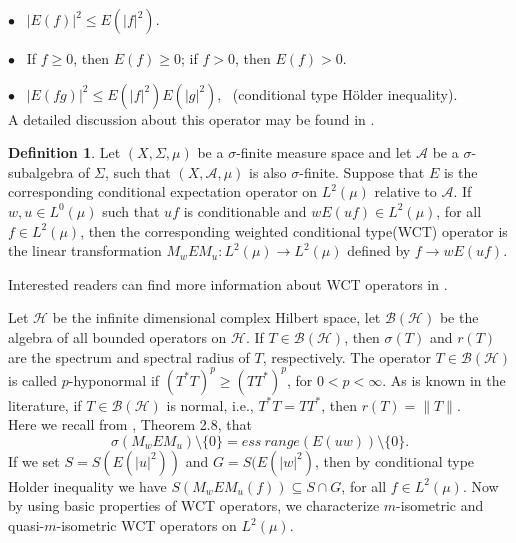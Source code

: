 \documentclass{amsart}
\theoremstyle{definition}\newtheorem{defn}[thm]{Definition}
\theoremstyle{remark}
\numberwithin{equation}{section}
\begin{document}
\noindent $\bullet$ \ $|E(f)|^2\leq E(|f|^2)$.

\noindent $\bullet$ \ If $f\geq 0$, then $E(f)\geq 0$; if $f>0$,
then $E(f)>0$.

\noindent $\bullet$ \ $|E(fg)|^2\leq
E(|f|^2)E(|g|^{2})$, \ (conditional type H\"{o}lder inequality).\\

A detailed
discussion about this operator may be found in \cite{rao}. \\
\begin{defn}
Let $(X,\Sigma,\mu)$ be a $\sigma$-finite measure space and let $\mathcal{A}$ be a
$\sigma$-subalgebra of $\Sigma$, such that $(X,\mathcal{A},\mu)$ is also $\sigma$-finite. Suppose that $E$ is the corresponding conditional
expectation operator on $L^2(\mu)$ relative to $\mathcal{A}$. If $w,u \in L^0(\mu)$ such that $uf$ is conditionable and $wE(uf)\in L^2(\mu)$, for all $f\in L^2(\mu)$, then the corresponding weighted conditional type(WCT) operator is the linear
transformation $M_wEM_u:L^2(\mu)\rightarrow L^2(\mu)$ defined by $f\rightarrow wE(uf)$.\\
\end{defn}
Interested readers can find more information about WCT operators in \cite{e2,e,e1,ej,her,dhd}.

Let $\mathcal{H}$ be the infinite dimensional complex Hilbert
space, let $\mathcal{B(H)}$ be the algebra of all bounded
operators on $\mathcal{H}$. If $T\in \mathcal{B(H)}$, then $\sigma(T)$ and $r(T)$ are the spectrum and spectral radius of $T$, respectively. 
The operator $T\in \mathcal{B(H)}$ is called $p$-hyponormal if $(T^{\ast}T)^p\geq
(TT^{\ast})^p$, for $0<p<\infty$. As is known in the literature, if $T\in \mathcal{B(H)}$ is normal, i.e., $T^*T=TT^*$, then $r(T)=\|T\|$.\\

Here we recall from \cite{e1}, Theorem 2.8, that $$\sigma(M_wEM_u)\setminus \{0\}=ess \ range(E(uw))\setminus \{0\}.$$
If we set $S=S(E(|u|^2))$ and $G=S(E(|w|^2)$, then by conditional type Holder inequality we have $S(M_wEM_u(f))\subseteq S\cap G$, for all $f\in L^2(\mu)$.
Now by using basic properties of WCT operators, we characterize $m$-isometric and quasi-$m$-isometric WCT operators on $L^2(\mu)$.
\end{document}
